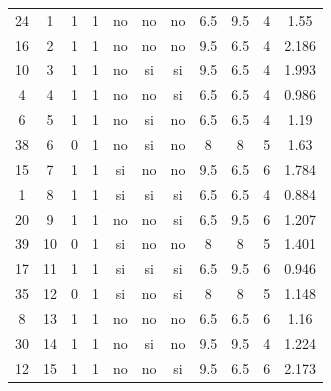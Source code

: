 \documentclass[12pt,a4paper,twoside,openright,titlepage,final]{article}
\begin{document}
\begin{appendices}
\begin{landscape}
\begin{center}
\begin{longtable}{@{\extracolsep{\fill}}*{11}{c}}
					24       & 1            & 1         & 1       & no   & no        & no           & 6.5        & 9.5           & 4             & 1.55   \\
					16       & 2            & 1         & 1       & no   & no        & no           & 9.5        & 6.5           & 4             & 2.186  \\
					10       & 3            & 1         & 1       & no   & si        & si           & 9.5        & 6.5           & 4             & 1.993  \\
					4        & 4            & 1         & 1       & no   & no        & si           & 6.5        & 6.5           & 4             & 0.986  \\
					6        & 5            & 1         & 1       & no   & si        & no           & 6.5        & 6.5           & 4             & 1.19   \\
					38       & 6            & 0         & 1       & no   & si        & no           & 8          & 8             & 5             & 1.63   \\
					15       & 7            & 1         & 1       & si   & no        & no           & 9.5        & 6.5           & 6             & 1.784  \\
					1        & 8            & 1         & 1       & si   & si        & si           & 6.5        & 6.5           & 4             & 0.884  \\
					20       & 9            & 1         & 1       & no   & no        & si           & 6.5        & 9.5           & 6             & 1.207  \\
					39       & 10           & 0         & 1       & si   & no        & no           & 8          & 8             & 5             & 1.401  \\
					17       & 11           & 1         & 1       & si   & si        & si           & 6.5        & 9.5           & 6             & 0.946  \\
					35       & 12           & 0         & 1       & si   & no        & si           & 8          & 8             & 5             & 1.148  \\
					8        & 13           & 1         & 1       & no   & no        & no           & 6.5        & 6.5           & 6             & 1.16   \\
					30       & 14           & 1         & 1       & no   & si        & no           & 9.5        & 9.5           & 4             & 1.224  \\
					12       & 15           & 1         & 1       & no   & no        & si           & 9.5        & 6.5           & 6             & 2.173  \\

\end{longtable}
\end{center}
\end{landscape}
\end{appendices}
\end{document}
